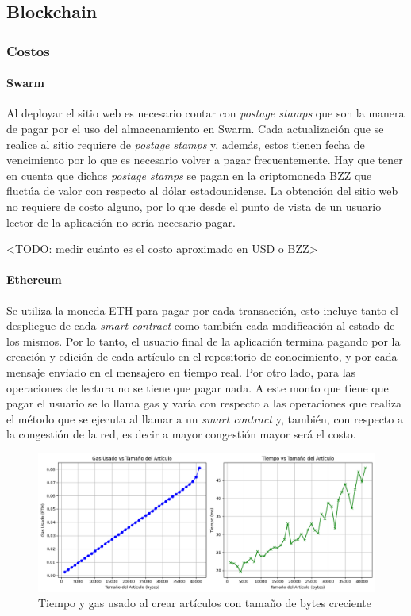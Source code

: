\subsection{Blockchain}

\subsubsection{Costos}

\paragraph{Swarm}
Al deployar el sitio web es necesario contar con \textit{postage stamps} que son la manera de pagar por el uso del almacenamiento en Swarm. Cada actualización que se realice al sitio requiere de \textit{postage stamps} y, además, estos tienen fecha de vencimiento por lo que es necesario volver a pagar frecuentemente. Hay que tener en cuenta que dichos \textit{postage stamps} se pagan en la criptomoneda BZZ que fluctúa de valor con respecto al dólar estadounidense. La obtención del sitio web no requiere de costo alguno, por lo que desde el punto de vista de un usuario lector de la aplicación no sería necesario pagar.

<TODO: medir cuánto es el costo aproximado en USD o BZZ>

\paragraph{Ethereum}
Se utiliza la moneda ETH para pagar por cada transacción, esto incluye tanto el despliegue de cada \textit{smart contract} como también cada modificación al estado de los mismos. Por lo tanto, el usuario final de la aplicación termina pagando por la creación y edición de cada artículo en el repositorio de conocimiento, y por cada mensaje enviado en el mensajero en tiempo real. Por otro lado, para las operaciones de lectura no se tiene que pagar nada. A este monto que tiene que pagar el usuario se lo llama gas y varía con respecto a las operaciones que realiza el método que se ejecuta al llamar a un \textit{smart contract} y, también, con respecto a la congestión de la red, es decir a mayor congestión mayor será el costo.

\begin{figure}[H]
    \centering
    \includegraphics[width=1\linewidth]{img/aw-eth-bytes-articulo-incremental.png}
    \caption{Tiempo y gas usado al crear artículos con tamaño de bytes creciente}
    \label{fig:aw-eth-bytes-articulo-incremental.png}
\end{figure}

